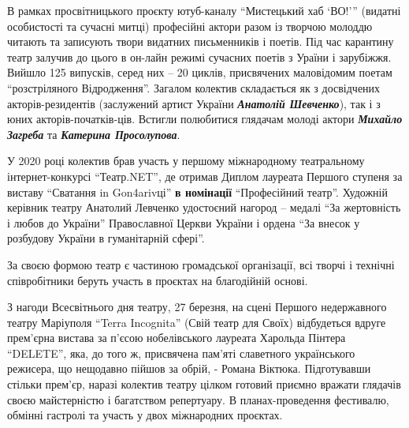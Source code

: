 
В рамках просвітницького проєкту ютуб-каналу \enquote{Мистецький хаб  \enquote{ВО!}} (видатні
особистості та сучасні митці) професійні актори разом із творчою молоддю
читають та записують твори видатних письменників і поетів. Під час карантину
театр залучив до цього в он-лайн режимі сучасних поетів з Ураїни і зарубіжжя.
Вийшло 125 випусків, серед них – 20 циклів, присвячених маловідомим поетам
\enquote{розстріляного Відродження}. Загалом колектив складається як з досвідчених
акторів-резидентів (заслужений артист України \emph{\textbf{Анатолій Шевченко}}), так і з юних
акторів-початків\hyp{}ців. Встигли полюбитися глядачам молоді актори \emph{\textbf{Михайло Загреба}}
та \emph{\textbf{Катерина Просолупова}}.


У 2020 році колектив брав участь у  першому міжнародному театральному
інтернет-конкурсі \enquote{Театр.NET}, де отримав Диплом лауреата Першого ступеня за
виставу \enquote{Сватання in Gon4arivці} \textbf{в номінації} \enquote{Професійний театр}. Художній
керівник театру Анатолий Левченко удостоєний нагород – медалі \enquote{За жертовність і
любов до України} Православної Церкви України і ордена \enquote{За внесок у розбудову
України в гуманітарній сфері}.

За своєю формою театр є частиною громадської організації, всі творчі і технічні
співробітники беруть участь в проєктах на благодійній основі.


З нагоди Всесвітнього дня театру, 27 березня, на сцені Першого недержавного
театру Маріуполя \enquote{Terra Incognita} (Свій театр для Своїх) відбудеться вдруге
прем'єрна вистава за п'єсою нобелівського лауреата Харольда Пінтера \enquote{DELETE},
яка, до того ж, присвячена пам'яті славетного українського режисера, що
нещодавно пійшов за обрій, - Романа Віктюка. Підготувавши стільки прем'єр,
наразі колектив театру цілком готовий приємно вражати глядачів своєю
майстерністю і багатством репертуару. В планах-проведення фестивалю, обмінні
гастролі та участь у двох міжнародних проєктах.

